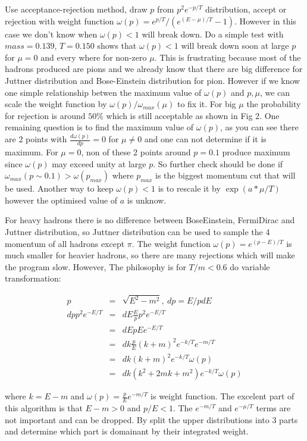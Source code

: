 \documentclass[11pt, oneside]{article}   	%
\begin{document}
Use acceptance-rejection method, draw $p$ from $p^{2}e^{-p/T}$ distribution,
accept or rejection with weight function $\omega(p)=e^{p/T}/(e^{(E-\mu)/T}-1)$.
However in this case we don't know when $\omega(p)<1$ will break
down. Do a simple test with $mass=0.139$, $T=0.150$ shows that $\omega(p)<1$
will break down soon at large $p$ for $\mu=0$ and every where for
non-zero $\mu$. This is frustrating because most of the hadrons produced
are pions and we already know that there are big difference for Juttner
distribution and Bose-Einstein distribution for pion. However if we
know one simple relationship betwen the maximum value of $\omega(p)$
and $p,\mu$, we can scale the weight function by $\omega(p)/\omega_{max}(\mu)$
to fix it. For big $\mu$ the probability for rejection is around
$50\%$ which is still acceptable as shown in Fig 2. One remaining
question is to find the maximum value of $\omega(p)$, as you can
see there are $2$ points with $\frac{d\omega(p)}{dp}=0$ for $\mu\neq0$
and one can not determine if it is maximum. For $\mu=0$, non of these
2 points around $p=0.1$ produce maximum since $\omega(p)$ may exceed
unity at large $p$. So further check should be done if $\omega_{max}(p\sim0.1)>\omega(p_{max})$
where $p_{max}$ is the biggest momentum cut that will be used. Another
way to keep $\omega(p)<1$ is to rescale it by $\exp(a*\mu/T)$ however
the optimised value of $a$ is unknow.

For heavy hadrons there is no difference between BoseEinstein, FermiDirac
and Juttner distribution, so Juttner distribution can be used to sample
the 4 momentum of all hadrons except $\pi.$ The weight function $\omega(p)=e^{(p-E)/T}$
is much smaller for heavier hadrons, so there are many rejections
which will make the program slow. However, The philosophy is for $T/m<0.6$
do variable transformation:


\begin{eqnarray}
p & = & \sqrt{E^{2}-m^{2}},\ dp=E/pdE\\
dpp^{2}e^{-E/T} & = & dE\frac{E}{p}p^{2}e^{-E/T}\\
 & = & dEpEe^{-E/T}\\
 & = & dk\frac{p}{E}(k+m)^{2}e^{-k/T}e^{-m/T}\\
 & = & dk(k+m)^{2}e^{-k/T}\omega(p)\\
 & = & dk(k^{2}+2mk+m^{2})e^{-k/T}\omega(p)
\end{eqnarray}


where $k=E-m$ and $\omega(p)=\frac{p}{E}e^{-m/T}$ is weight function.
The excelent part of this algorithm is that $E-m>0$ and $p/E<1$.
The $e^{-m/T}$ and $e^{-\mu/T}$ terms are not important and can
be dropped. By split the upper distributions into 3 parts and determine
which part is domainant by their integrated weight.
\end{document}
